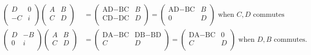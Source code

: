 \documentclass{article}
\numberwithin{equation}{subsection} %
\theoremstyle{definition}
\begin{document}
        \begin{align*}
            \left(
                \begin{array}{cc}
                 D & 0 \\
                 -C & i \\
                \end{array}
            \right) \left(
                \begin{array}{cc}
                 A & B \\
                 C & D \\
                \end{array}
            \right) &= \left(
                \begin{array}{cc}
                 \text{AD}-\text{BC} & B \\
                 \text{CD}-\text{DC} & D \\
                \end{array}
            \right)=\left(
                \begin{array}{cc}
                 \text{AD}-\text{BC} & B \\
                 0 & D \\
                \end{array}
            \right) \text{ when $C,D$ commutes}
            \\
            \left(
                \begin{array}{cc}
                 D & -B \\
                 0 & i \\
                \end{array}
            \right) \left(
                \begin{array}{cc}
                 A & B \\
                 C & D \\
                \end{array}
            \right) &= \left(
                \begin{array}{cc}
                 \text{DA}-\text{BC} & \text{DB}-\text{BD} \\
                 C & D \\
                \end{array}
            \right)=\left(
                \begin{array}{cc}
                 \text{DA}-\text{BC} & 0 \\
                 C & D \\
                \end{array}
            \right) \text{ when $D,B$ commutes.}
        \end{align*}
\end{document}
